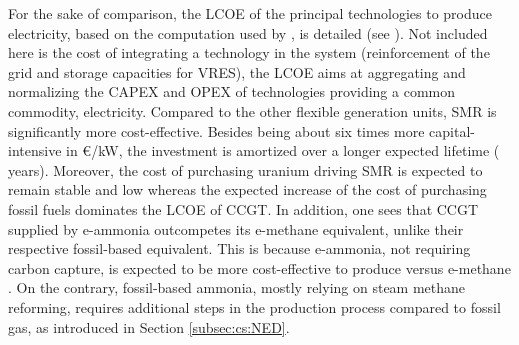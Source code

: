 %

For the sake of comparison, the \gls{LCOE} of the principal technologies to produce electricity, based on the computation used by \citet{limpens2021generating}, is detailed (see ). Not included here is the cost of integrating a technology in the system (\eg reinforcement of the grid and storage capacities for \gls{VRES}), the \gls{LCOE} aims at aggregating and normalizing the CAPEX and OPEX of technologies providing a common commodity, \ie electricity. Compared to the other flexible generation units, \gls{SMR} is significantly more cost-effective. Besides being about six times more capital-intensive in €/kW, the investment is amortized over a longer expected lifetime ( years). Moreover, the cost of purchasing uranium driving \gls{SMR} is expected to remain stable and low whereas the expected increase of the cost of purchasing fossil fuels dominates the \gls{LCOE} of \gls{CCGT}. In addition, one sees that \gls{CCGT} supplied by e-ammonia outcompetes its e-methane equivalent, unlike their respective fossil-based equivalent. This is because e-ammonia, not requiring carbon capture, is expected to be more cost-effective to produce versus e-methane \cite{h2coalition}. On the contrary, fossil-based ammonia, mostly relying on steam methane reforming, requires additional steps in the production process compared to fossil gas, as introduced in Section \ref{subsec:cs:NED}.

